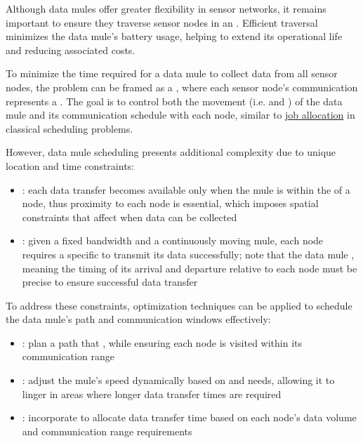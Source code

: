 \documentclass[a4paper, 12pt]{report}
\begin{document}
    Although data mules offer greater flexibility in sensor networks, it remains important to ensure they traverse sensor nodes in an . Efficient traversal minimizes the data mule's battery usage, helping to extend its operational life and reducing associated costs.

    To minimize the time required for a data mule to collect data from all sensor nodes, the problem can be framed as a , where each sensor node's communication represents a . The goal is to control both the movement (i.e.  and ) of the data mule and its communication schedule with each node, similar to \href{https://en.wikipedia.org/wiki/Optimal_job_scheduling}{job allocation} in classical scheduling problems.

    However, data mule scheduling presents additional complexity due to unique location and time constraints:

    \begin{itemize}
        \item {}: each data transfer becomes available only when the mule is within the  of a node, thus proximity to each node is essential, which imposes spatial constraints that affect when data can be collected
        \item {}: given a fixed bandwidth and a continuously moving mule, each node requires a specific  to transmit its data successfully; note that the data mule , meaning the timing of its arrival and departure relative to each node must be precise to ensure successful data transfer
    \end{itemize}

    To address these constraints, optimization techniques can be applied to schedule the data mule's path and communication windows effectively:

    \begin{itemize}
        \item {}: plan a path that , while ensuring each node is visited within its communication range
        \item {}: adjust the mule's speed dynamically based on  and  needs, allowing it to linger in areas where longer data transfer times are required
        \item {}: incorporate  to allocate data transfer time based on each node's data volume and communication range requirements
    \end{itemize}
\end{document}
